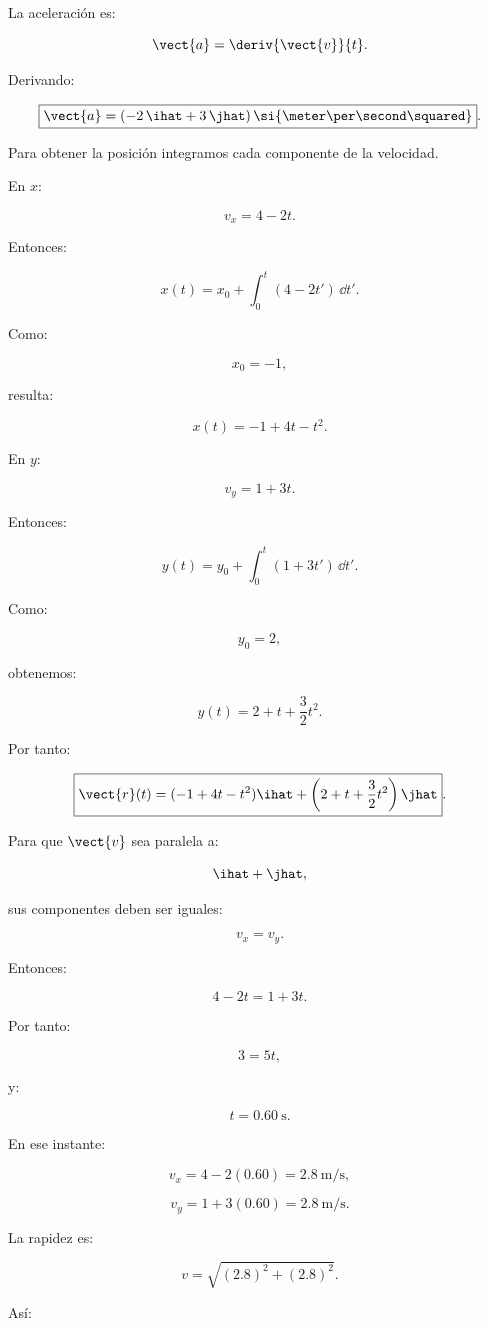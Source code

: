 \begin{explicacion}
La aceleración es:

\[
\vect{a}
=
\deriv{\vect{v}}{t}.
\]

Derivando:

\[
\boxed{
\vect{a}
=
(-2\,\ihat+3\,\jhat)\,
\si{\meter\per\second\squared}
}.
\]

Para obtener la posición integramos cada componente de la velocidad.

En \(x\):

\[
v_x=4-2t.
\]

Entonces:

\[
x(t)
=
x_0+\int_0^t(4-2t')\,\dd t'.
\]

Como:

\[
x_0=-1,
\]

resulta:

\[
x(t)
=
-1+4t-t^2.
\]

En \(y\):

\[
v_y=1+3t.
\]

Entonces:

\[
y(t)
=
y_0+\int_0^t(1+3t')\,\dd t'.
\]

Como:

\[
y_0=2,
\]

obtenemos:

\[
y(t)
=
2+t+\frac{3}{2}t^2.
\]

Por tanto:

\[
\boxed{
\vect{r}(t)
=
(-1+4t-t^2)\ihat
+
\left(2+t+\frac{3}{2}t^2\right)\jhat
}.
\]

Para que \(\vect{v}\) sea paralela a:

\[
\ihat+\jhat,
\]

sus componentes deben ser iguales:

\[
v_x=v_y.
\]

Entonces:

\[
4-2t=1+3t.
\]

Por tanto:

\[
3=5t,
\]

y:

\[
\boxed{t=\SI{0.60}{\second}}.
\]

En ese instante:

\[
v_x
=
4-2(0.60)
=
\SI{2.8}{\meter\per\second},
\]

\[
v_y
=
1+3(0.60)
=
\SI{2.8}{\meter\per\second}.
\]

La rapidez es:

\[
v
=
\sqrt{(2.8)^2+(2.8)^2}.
\]

Así:


\end{explicacion}
